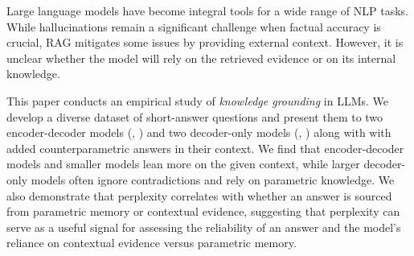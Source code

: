 Large language models have become integral tools for a wide range of NLP tasks.
While hallucinations remain a significant challenge when factual accuracy is crucial, RAG mitigates some issues by providing external context.
However, it is unclear whether the model will rely on the retrieved evidence or on its internal knowledge.

This paper conducts an empirical study of \emph{knowledge grounding} in LLMs.
We develop a diverse dataset of short-answer questions and present them to two encoder-decoder models (\smallflan{}, \bigflan{}) and two decoder-only models (\smallllama{}, \bigllama{}) along with with added counterparametric answers in their context.
We find that encoder-decoder models and smaller models lean more on the given context, while larger decoder-only models often ignore contradictions and rely on parametric knowledge. We also demonstrate that perplexity correlates with whether an answer is sourced from parametric memory or contextual evidence, suggesting that perplexity can serve as a useful signal for assessing the reliability of an answer and the model’s reliance on contextual evidence versus parametric memory.

